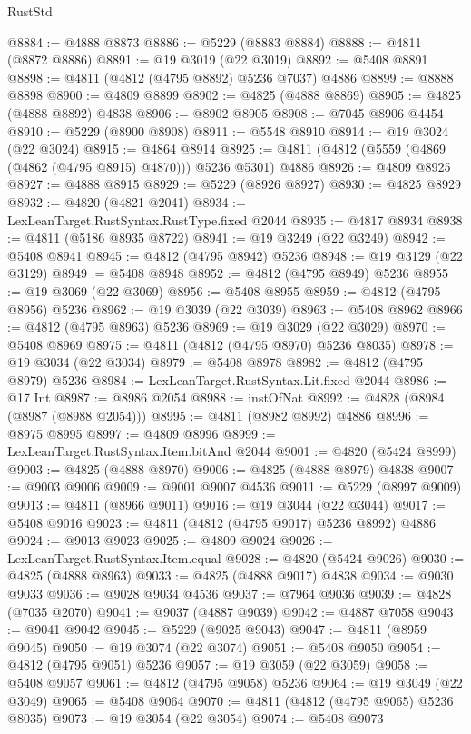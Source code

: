 \begin{lexlean}{RustStd}
\begin{coremodule}
{\begin{coremodule}
{{{{{{{{{{{{{{{{{{{{{{{{{{{{{{{{{{{{{{{{{{{{{{{{{{{{{{{{{{{{{{{{{{{{{{{{{{{{{{{{@8884 := @4888 @8873
@8886 := @5229 (@8883 @8884)
@8888 := @4811 (@8872 @8886)
@8891 := @19 @3019 (@22 @3019)
@8892 := @5408 @8891
@8898 := @4811 (@4812 (@4795 @8892) @5236 @7037) @4886
@8899 := @8888 @8898
@8900 := @4809 @8899
@8902 := @4825 (@4888 @8869)
@8905 := @4825 (@4888 @8892) @4838
@8906 := @8902 @8905
@8908 := @7045 @8906 @4454
@8910 := @5229 (@8900 @8908)
@8911 := @5548 @8910
@8914 := @19 @3024 (@22 @3024)
@8915 := @4864 @8914
@8925 := @4811 (@4812 (@5559 (@4869 (@4862 (@4795 @8915) @4870))) @5236 @5301) @4886
@8926 := @4809 @8925
@8927 := @4888 @8915
@8929 := @5229 (@8926 @8927)
@8930 := @4825 @8929
@8932 := @4820 (@4821 @2041)
@8934 := LexLeanTarget.RustSyntax.RustType.fixed @2044
@8935 := @4817 @8934
@8938 := @4811 (@5186 @8935 @8722)
@8941 := @19 @3249 (@22 @3249)
@8942 := @5408 @8941
@8945 := @4812 (@4795 @8942) @5236
@8948 := @19 @3129 (@22 @3129)
@8949 := @5408 @8948
@8952 := @4812 (@4795 @8949) @5236
@8955 := @19 @3069 (@22 @3069)
@8956 := @5408 @8955
@8959 := @4812 (@4795 @8956) @5236
@8962 := @19 @3039 (@22 @3039)
@8963 := @5408 @8962
@8966 := @4812 (@4795 @8963) @5236
@8969 := @19 @3029 (@22 @3029)
@8970 := @5408 @8969
@8975 := @4811 (@4812 (@4795 @8970) @5236 @8035)
@8978 := @19 @3034 (@22 @3034)
@8979 := @5408 @8978
@8982 := @4812 (@4795 @8979) @5236
@8984 := LexLeanTarget.RustSyntax.Lit.fixed @2044
@8986 := @17 Int
@8987 := @8986 @2054
@8988 := instOfNat
@8992 := @4828 (@8984 (@8987 (@8988 @2054)))
@8995 := @4811 (@8982 @8992) @4886
@8996 := @8975 @8995
@8997 := @4809 @8996
@8999 := LexLeanTarget.RustSyntax.Item.bitAnd @2044
@9001 := @4820 (@5424 @8999)
@9003 := @4825 (@4888 @8970)
@9006 := @4825 (@4888 @8979) @4838
@9007 := @9003 @9006
@9009 := @9001 @9007 @4536
@9011 := @5229 (@8997 @9009)
@9013 := @4811 (@8966 @9011)
@9016 := @19 @3044 (@22 @3044)
@9017 := @5408 @9016
@9023 := @4811 (@4812 (@4795 @9017) @5236 @8992) @4886
@9024 := @9013 @9023
@9025 := @4809 @9024
@9026 := LexLeanTarget.RustSyntax.Item.equal
@9028 := @4820 (@5424 @9026)
@9030 := @4825 (@4888 @8963)
@9033 := @4825 (@4888 @9017) @4838
@9034 := @9030 @9033
@9036 := @9028 @9034 @4536
@9037 := @7964 @9036
@9039 := @4828 (@7035 @2070)
@9041 := @9037 (@4887 @9039)
@9042 := @4887 @7058
@9043 := @9041 @9042
@9045 := @5229 (@9025 @9043)
@9047 := @4811 (@8959 @9045)
@9050 := @19 @3074 (@22 @3074)
@9051 := @5408 @9050
@9054 := @4812 (@4795 @9051) @5236
@9057 := @19 @3059 (@22 @3059)
@9058 := @5408 @9057
@9061 := @4812 (@4795 @9058) @5236
@9064 := @19 @3049 (@22 @3049)
@9065 := @5408 @9064
@9070 := @4811 (@4812 (@4795 @9065) @5236 @8035)
@9073 := @19 @3054 (@22 @3054)
@9074 := @5408 @9073
}}}}}}}}}}}}}}}}}}}}}}}}}}}}}}}}}}}}}}}}}}}}}}}}}}}}}}}}}}}}}}}}}}}}}}}}}}}}}}}}
\end{coremodule}}
\end{coremodule}
\end{lexlean}

